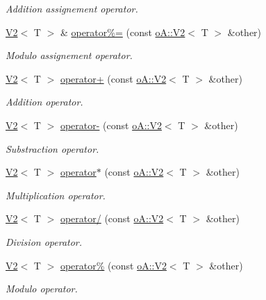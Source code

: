 \begin{DoxyCompactItemize}
\begin{DoxyCompactList}\small\item\em Addition assignement operator. \end{DoxyCompactList}\item 
\mbox{\hyperlink{structo_a_1_1_v2}{V2}}$<$ T $>$ \& \mbox{\hyperlink{structo_a_1_1_v2_acd10d3ff2a5744713a159eebd0d89a4e}{operator\%=}} (const \mbox{\hyperlink{structo_a_1_1_v2}{o\+A\+::\+V2}}$<$ T $>$ \&other)
\begin{DoxyCompactList}\small\item\em Modulo assignement operator. \end{DoxyCompactList}\item 
\mbox{\hyperlink{structo_a_1_1_v2}{V2}}$<$ T $>$ \mbox{\hyperlink{structo_a_1_1_v2_a9b089bbe3ae2f0a2166a79eb240159ad}{operator+}} (const \mbox{\hyperlink{structo_a_1_1_v2}{o\+A\+::\+V2}}$<$ T $>$ \&other)
\begin{DoxyCompactList}\small\item\em Addition operator. \end{DoxyCompactList}\item 
\mbox{\hyperlink{structo_a_1_1_v2}{V2}}$<$ T $>$ \mbox{\hyperlink{structo_a_1_1_v2_af1a6777d0bae8bbe2aeee4f15da03162}{operator-\/}} (const \mbox{\hyperlink{structo_a_1_1_v2}{o\+A\+::\+V2}}$<$ T $>$ \&other)
\begin{DoxyCompactList}\small\item\em Substraction operator. \end{DoxyCompactList}\item 
\mbox{\hyperlink{structo_a_1_1_v2}{V2}}$<$ T $>$ \mbox{\hyperlink{structo_a_1_1_v2_a9e3ca71d8d85ad4bbcb418080acafceb}{operator$\ast$}} (const \mbox{\hyperlink{structo_a_1_1_v2}{o\+A\+::\+V2}}$<$ T $>$ \&other)
\begin{DoxyCompactList}\small\item\em Multiplication operator. \end{DoxyCompactList}\item 
\mbox{\hyperlink{structo_a_1_1_v2}{V2}}$<$ T $>$ \mbox{\hyperlink{structo_a_1_1_v2_a62fad7a505de2e093da7d9d8a01342c2}{operator/}} (const \mbox{\hyperlink{structo_a_1_1_v2}{o\+A\+::\+V2}}$<$ T $>$ \&other)
\begin{DoxyCompactList}\small\item\em Division operator. \end{DoxyCompactList}\item 
\mbox{\hyperlink{structo_a_1_1_v2}{V2}}$<$ T $>$ \mbox{\hyperlink{structo_a_1_1_v2_a0566d5d8796320c591462eb26ebffdce}{operator\%}} (const \mbox{\hyperlink{structo_a_1_1_v2}{o\+A\+::\+V2}}$<$ T $>$ \&other)
\begin{DoxyCompactList}\small\item\em Modulo operator. \end{DoxyCompactList}\end{DoxyCompactItemize}
